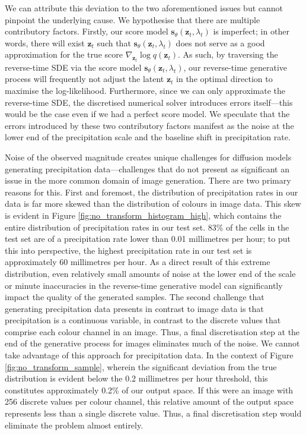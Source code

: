 \documentclass[ oneside,%
                    author={George Herbert},
                    degree={MSci},
                     title={Diffusion Models for Time-Evolving Precipitation Fields},
                  subtitle={}]{dissertation}
\begin{document}
We can attribute this deviation to the two aforementioned issues but cannot pinpoint the underlying cause. We hypothesise that there are multiple contributory factors. Firstly, our score model $\mathbf{s}_\theta(\mathbf{z}_t, \lambda_t)$ is imperfect; in other words, there will exist $\mathbf{z}_t$ such that $\mathbf{s}_\theta(\mathbf{z}_t, \lambda_t)$ does not serve as a good approximation for the true score $\nabla_{\mathbf{z}_t}  \log q(\mathbf{z}_t)$. As such, by traversing the reverse-time SDE via the score model $\mathbf{s}_\theta(\mathbf{z}_t,\lambda_t)$, our reverse-time generative process will frequently not adjust the latent $\mathbf{z}_t$ in the optimal direction to maximise the log-likelihood. Furthermore, since we can only approximate the reverse-time SDE, the discretised numerical solver introduces errors itself---this would be the case even if we had a perfect score model. We speculate that the errors introduced by these two contributory factors manifest as the noise at the lower end of the precipitation scale and the baseline shift in precipitation rate.

Noise of the observed magnitude creates unique challenges for diffusion models generating precipitation data---challenges that do not present as significant an issue in the more common domain of image generation. There are two primary reasons for this. First and foremost, the distribution of precipitation rates in our data is far more skewed than the distribution of colours in image data. This skew is evident in Figure \ref{fig:no_transform_histogram_high}, which contains the entire distribution of precipitation rates in our test set. 83\% of the cells in the test set are of a precipitation rate lower than 0.01 millimetres per hour; to put this into perspective, the highest precipitation rate in our test set is approximately 60 millimetres per hour. As a direct result of this extreme distribution, even relatively small amounts of noise at the lower end of the scale or minute inaccuracies in the reverse-time generative model can significantly impact the quality of the generated samples. The second challenge that generating precipitation data presents in contrast to image data is that precipitation is a continuous variable, in contrast to the discrete values that comprise each colour channel in an image. Thus, a final discretisation step at the end of the generative process for images eliminates much of the noise. We cannot take advantage of this approach for precipitation data. In the context of Figure \ref{fig:no_transform_sample}, wherein the significant deviation from the true distribution is evident below the 0.2 millimetres per hour threshold, this constitutes approximately 0.2\% of our output space. If this were an image with 256 discrete values per colour channel, this relative amount of the output space represents less than a single discrete value. Thus, a final discretisation step would eliminate the problem almost entirely.
\end{document}
